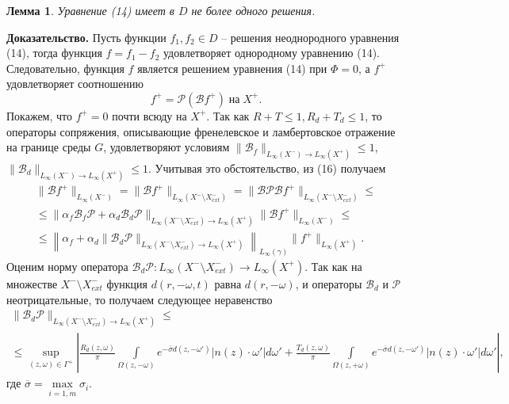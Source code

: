\documentclass[12pt,reqno]{report}
\newtheorem{lemma}{Лемма}
\begin{document}
\begin{lemma}
Уравнение (14) 	  имеет в $D$ не более одного решения.
\end{lemma}
{\bf Доказательство.}
Пусть функции $f_1,f_2\in D$ -- решения неоднородного уравнения (14), тогда функция  $f=f_1-f_2$ удовлетворяет однородному уравнению (14). Следовательно, функция $f$ является решением уравнения  (14) при $\Phi=0$, а $f^+$ удовлетворяет  соотношению
\begin{equation}
f^+= \mathcal P (\mathcal B f^+)\; \text{на} \; X^+.
\end{equation}
Покажем, что $f^+=0$ почти всюду на $X^+$. 
Так как $R+T \leq 1, R_d+T_d \leq 1$, то  операторы сопряжения,  описывающие
френелевское и ламбертовское  отражение на границе среды $G$, удовлетворяют условиям  
$\|\mathcal B_f \|_{L_{\infty}(X^-)\to L_{\infty}(X^+)}\leq 1 $, $\|\mathcal B_d \|_{L_{\infty}(X^-)\to L_{\infty}(X^+)} \leq 1$. Учитывая это обстоятельство,  из (16) получаем
\begin{multline}
\|\mathcal B f^+\|_{L_{\infty}(X^-)} = \|\mathcal B f^+\|_{L_{\infty}(X^-\setminus X^-_{ext})} = \| \mathcal B \mathcal P \mathcal B  f^+\|_{L_{\infty}(X^-\setminus X^-_{ext})} \leq \\ \leq  \| \alpha_f \mathcal B_f \mathcal P   +\alpha_d \mathcal B_d \mathcal P\|_{L_{\infty}(X^-\setminus X^-_{ext})\to L_{\infty}(X^+)} \|  \mathcal B f^+\|_{L_{\infty}(X^-)} \leq \\ \leq \left \| \alpha_f  +\alpha_d \|\mathcal B_d  \mathcal P \|_{L_{\infty}(X^-\setminus X^-_{ext})\to L_{\infty}(X^+)} \right\|_{L_{\infty}(\gamma)} \|   f^+\|_{L_{\infty}(X^+)}.
\end{multline}
Оценим норму  оператора
$\mathcal B_d \mathcal P: L_{\infty}(X^-\setminus X^-_{ext})\to L_{\infty}(X^+)$.
Так как на множестве $X^- \setminus X^-_{ext}$ функция $d(r,-\omega,t)$ равна $d(r,-\omega)$,  
и операторы $\mathcal B_d$ и $\mathcal P$ неотрицательные, то получаем следующее неравенство \begin{multline}
\|\mathcal B_d \mathcal  P  \|_{L_{\infty}(X^-\setminus X^-_{ext})\to L_{\infty}(X^+)} \leq \\ \leq  \sup \limits_{(z,\omega)\in \Gamma^+} \left| \frac{R_d (z,\omega)}{\pi}  \int
\limits_{\Omega(z,-\omega)} e^{-\overline{\sigma} d(z,-\omega')} |n(z)\cdot \omega'| d \omega' +   \frac{T_d (z,\omega)}{\pi} \int
\limits_{\Omega(z,+\omega)} e^{-\overline{\sigma} d(z,-\omega')} |n(z)\cdot \omega'| d
\omega'  \right|,
\end{multline}
где $\overline{\sigma}=\max \limits_{i=\overline{1,m}} \sigma_i$.
\end{document}
